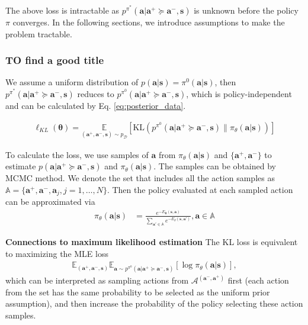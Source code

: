 The above loss is intractable as $p^{\pi^*}(\bm a|\bm a^+ \succeq \bm a^-, \bm s)$ is unknown before the policy $\pi$ converges. 
In the following sections, we introduce assumptions to make the problem tractable.

\subsubsection{ TO find a good title}
We assume a uniform distribution of $p(\bm a | \bm s) = \pi^0 (\bm a| \bm s)$, then $p^{\pi^*}(\bm a|\bm a^+ \succeq \bm a^-, \bm s)$ reduces to $p^{\pi^0}(\bm a|\bm a^+ \succeq \bm a^-, \bm s)$, which is policy-independent and can be calculated by Eq. \eqref{eq:posterior_data}.

\begin{align*}
    \ell_{KL}(\bm \theta) = \!\! \underset{(\bm{a}^{+}, \bm{a}^{-}, \bm{s}) \sim p_{\mathcal D}}{\mathbb{E}} \left[ \mathrm{KL}\left(p^{\pi^0}\!(\bm a|\bm a^+ \succeq \bm a^-, \bm s) \big\| \pi_{\theta}(\bm a | \bm s) \right) \right] 
\end{align*}

To calculate the loss, we use samples of $\bm a$ from $\pi_{\theta}(\bm a | \bm s)$ and $\{ \bm a^{+},  \bm a^{-} \}$ to estimate $p (\bm a|\bm a^+ \succeq \bm a^-, \bm s)$ and $\pi_{\theta}(\bm a | \bm s)$.
The samples can be obtained by MCMC method.
We denote the set that includes all the action samples as $\mathbb A = \{ \bm a^+, \bm a^-,  \bm a_j, j = 1, \dots, N \}$. 
Then the policy evaluated at each sampled action can be approximated via 
\begin{align*}
    \pi_{\theta}(\bm a | \bm s) & = \frac{e^{-E_{\bm \theta}(\bm s, \bm a)}}{\sum_{\bm a' \in \mathbb A} e^{-E_{\theta}(\bm s, \bm a')}}, \bm a \in \mathbb A
\end{align*}

\textbf{Connections to maximum likelihood estimation}
The KL loss is equivalent to maximizing the MLE loss
\begin{align}
   \mathbb{E}_{(\bm a^{+},  \bm a^{-}, \bm s)} \mathbb{E}_{\bm a \sim p^{\pi^0} (\bm a|\bm a^+ \succeq \bm a^-, \bm s)}[\log \pi_{\theta}(\bm a | \bm s)],
\end{align}
which can be interpreted as sampling actions from $\mathcal{A}^{(\bm a^-, \bm a^+)}$ first (each action from the set has the same probability to be selected as the uniform prior assumption), and then increase the probability of the policy selecting these action samples. 







